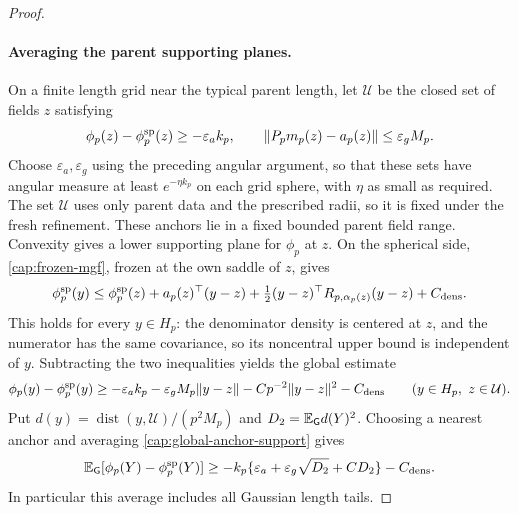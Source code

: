 \begin{proof}
\paragraph{Averaging the parent supporting planes.}
On a finite length grid near the typical parent length, let $\mathcal U$
be the closed set of fields $z$ satisfying
\[
 \phi_p(z)-\phi_p^{\rm sp}(z)\ge-\varepsilon_ak_p,
 \qquad \|P_pm_p(z)-a_p(z)\|\le\varepsilon_gM_p.
\]
Choose $\varepsilon_a,\varepsilon_g$ using the preceding angular
argument, so that these sets have angular measure at least
$e^{-\eta k_p}$ on each grid sphere, with $\eta$ as small as required.
The set $\mathcal U$ uses only parent data and the prescribed radii,
so it is fixed under the fresh refinement. These anchors lie in a fixed
bounded parent field range. Convexity gives
a lower supporting plane for $\phi_p$ at $z$. On the spherical side,
\eqref{cap:frozen-mgf}, frozen at the own saddle of $z$, gives
\[
 \phi_p^{\rm sp}(y)\le\phi_p^{\rm sp}(z)
       +a_p(z)^\top(y-z)
       +\tfrac12(y-z)^\top R_{p,\alpha_p(z)}(y-z)+C_{\rm dens}.
\]
This holds for every $y\in H_p$: the denominator density is centered at
$z$, and the numerator has the same covariance, so its noncentral upper
bound is independent of $y$. Subtracting the two inequalities yields the
global estimate
\begin{equation}\label{cap:global-anchor-support}
 \phi_p(y)-\phi_p^{\rm sp}(y)
 \ge-\varepsilon_ak_p-\varepsilon_gM_p\|y-z\|
       -Cp^{-2}\|y-z\|^2-C_{\rm dens}
 \qquad(y\in H_p,\ z\in\mathcal U).
\end{equation}
Put $d(y)=\operatorname{dist}(y,\mathcal U)/(p^2M_p)$ and
$D_2=\mathbb E_{\mathsf G}d(Y)^2$. Choosing a nearest anchor and averaging
\eqref{cap:global-anchor-support} gives
\begin{equation}\label{cap:averaged-anchor-support}
 \mathbb E_{\mathsf G}[\phi_p(Y)-\phi_p^{\rm sp}(Y)]
 \ge-k_p\{\varepsilon_a+\varepsilon_g\sqrt{D_2}+CD_2\}
       -C_{\rm dens}.
\end{equation}
In particular this average includes all Gaussian length tails.


\end{proof}
